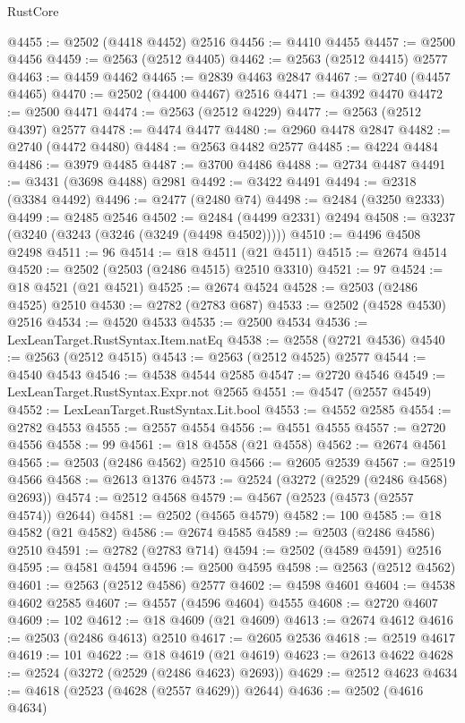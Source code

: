 \begin{lexlean}{RustCore}
\begin{coremodule}
@4455 := @2502 (@4418 @4452) @2516
@4456 := @4410 @4455
@4457 := @2500 @4456
@4459 := @2563 (@2512 @4405)
@4462 := @2563 (@2512 @4415) @2577
@4463 := @4459 @4462
@4465 := @2839 @4463 @2847
@4467 := @2740 (@4457 @4465)
@4470 := @2502 (@4400 @4467) @2516
@4471 := @4392 @4470
@4472 := @2500 @4471
@4474 := @2563 (@2512 @4229)
@4477 := @2563 (@2512 @4397) @2577
@4478 := @4474 @4477
@4480 := @2960 @4478 @2847
@4482 := @2740 (@4472 @4480)
@4484 := @2563 @4482 @2577
@4485 := @4224 @4484
@4486 := @3979 @4485
@4487 := @3700 @4486
@4488 := @2734 @4487
@4491 := @3431 (@3698 @4488) @2981
@4492 := @3422 @4491
@4494 := @2318 (@3384 @4492)
@4496 := @2477 (@2480 @74)
@4498 := @2484 (@3250 @2333)
@4499 := @2485 @2546
@4502 := @2484 (@4499 @2331) @2494
@4508 := @3237 (@3240 (@3243 (@3246 (@3249 (@4498 @4502)))))
@4510 := @4496 @4508 @2498
@4511 := 96
@4514 := @18 @4511 (@21 @4511)
@4515 := @2674 @4514
@4520 := @2502 (@2503 (@2486 @4515) @2510 @3310)
@4521 := 97
@4524 := @18 @4521 (@21 @4521)
@4525 := @2674 @4524
@4528 := @2503 (@2486 @4525) @2510
@4530 := @2782 (@2783 @687)
@4533 := @2502 (@4528 @4530) @2516
@4534 := @4520 @4533
@4535 := @2500 @4534
@4536 := LexLeanTarget.RustSyntax.Item.natEq
@4538 := @2558 (@2721 @4536)
@4540 := @2563 (@2512 @4515)
@4543 := @2563 (@2512 @4525) @2577
@4544 := @4540 @4543
@4546 := @4538 @4544 @2585
@4547 := @2720 @4546
@4549 := LexLeanTarget.RustSyntax.Expr.not @2565
@4551 := @4547 (@2557 @4549)
@4552 := LexLeanTarget.RustSyntax.Lit.bool
@4553 := @4552 @2585
@4554 := @2782 @4553
@4555 := @2557 @4554
@4556 := @4551 @4555
@4557 := @2720 @4556
@4558 := 99
@4561 := @18 @4558 (@21 @4558)
@4562 := @2674 @4561
@4565 := @2503 (@2486 @4562) @2510
@4566 := @2605 @2539
@4567 := @2519 @4566
@4568 := @2613 @1376
@4573 := @2524 (@3272 (@2529 (@2486 @4568) @2693))
@4574 := @2512 @4568
@4579 := @4567 (@2523 (@4573 (@2557 @4574)) @2644)
@4581 := @2502 (@4565 @4579)
@4582 := 100
@4585 := @18 @4582 (@21 @4582)
@4586 := @2674 @4585
@4589 := @2503 (@2486 @4586) @2510
@4591 := @2782 (@2783 @714)
@4594 := @2502 (@4589 @4591) @2516
@4595 := @4581 @4594
@4596 := @2500 @4595
@4598 := @2563 (@2512 @4562)
@4601 := @2563 (@2512 @4586) @2577
@4602 := @4598 @4601
@4604 := @4538 @4602 @2585
@4607 := @4557 (@4596 @4604) @4555
@4608 := @2720 @4607
@4609 := 102
@4612 := @18 @4609 (@21 @4609)
@4613 := @2674 @4612
@4616 := @2503 (@2486 @4613) @2510
@4617 := @2605 @2536
@4618 := @2519 @4617
@4619 := 101
@4622 := @18 @4619 (@21 @4619)
@4623 := @2613 @4622
@4628 := @2524 (@3272 (@2529 (@2486 @4623) @2693))
@4629 := @2512 @4623
@4634 := @4618 (@2523 (@4628 (@2557 @4629)) @2644)
@4636 := @2502 (@4616 @4634)

\end{coremodule}
\end{lexlean}
